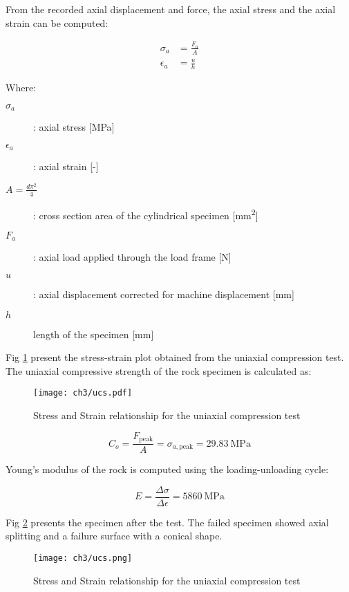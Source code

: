 From the recorded axial displacement and force, the axial stress and the axial strain can be computed: 

\begin{align}
    \sigma_a &= \frac{F_a}{A} \\
    \epsilon_a &= \frac{u}{h}
\end{align}

Where:

\begin{description}
    \item[$\sigma_a$] : axial stress  [\si{\mega\pascal}]
    \item[$\epsilon_a$] : axial strain [-]
    \item[$A=\frac{d\pi^2}{4}$] : cross section area of the cylindrical specimen [\si{\milli\meter\squared}]
    \item[$F_a$] :  axial load applied through the load frame [\si{\newton}]
    \item[$u$] : axial displacement corrected for machine displacement [\si{\milli\meter}]
    \item[$h$]  length of the specimen [\si{\milli\meter}]
\end{description}

Fig \ref{fig3:2} present the stress-strain plot obtained from the uniaxial compression test. The uniaxial compressive strength of the rock specimen is calculated as: 


\begin{figure}[tb]
    \centering
    \texttt{[image: ch3/ucs.pdf]}
    \caption{Stress and Strain relationship for the uniaxial compression test}
    \label{fig3:2}
\end{figure} 

\begin{equation}
    C_o = \frac{F_\text{peak}}{A} = \sigma_{a,\text{peak}} = \SI{29.83}{\mega\pascal}
\end{equation}

Young’s modulus of the rock is computed using the loading-unloading cycle:

\begin{equation}
    E=\frac{\Delta\sigma}{\Delta\epsilon} = \SI{5860}{\mega\pascal}
\end{equation}

Fig \ref{fig3:3} presents the specimen after the test. The failed specimen showed axial splitting and a failure surface with a conical shape. 

\begin{figure}[tb]
    \centering
    \texttt{[image: ch3/ucs.png]}
    \caption{Stress and Strain relationship for the uniaxial compression test}
    \label{fig3:3}
\end{figure} 

